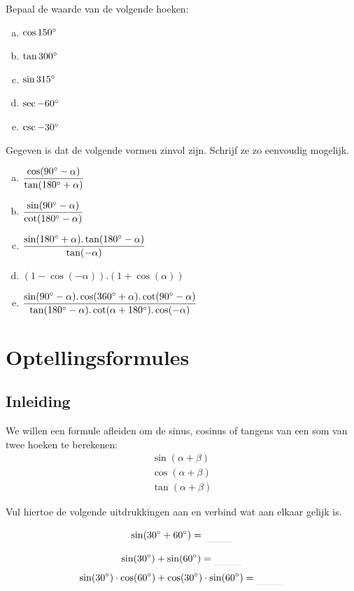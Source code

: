 \documentclass[a4paper,12pt]{article}
\begin{document}
\begin{oefening}
Bepaal de waarde van de volgende hoeken:
\begin{enumerate}[(a)]
  \itemsep.5em
  \item $\cos 150^\circ$
  \item $\tan 300^\circ$
  \item $\sin 315^\circ$
  \item $\sec -60^\circ$
  \item $\csc -30^\circ$
\end{enumerate}
\end{oefening}

\begin{oefening}
Gegeven is dat de volgende vormen zinvol zijn. Schrijf ze zo eenvoudig mogelijk.
\begin{enumerate}[(a)]
  \itemsep1em
  \item $\dfrac{\cos(90^\circ-\alpha)}{\tan(180^\circ+\alpha)}$
  \item $\dfrac{\sin(90^\circ-\alpha)}{\cot(180^\circ-\alpha)}$
  \item $\dfrac{\sin(180^\circ+\alpha).\tan(180^\circ-\alpha)}{\tan(-\alpha)}$
  \item $(1-\cos(-\alpha)).(1+\cos(\alpha))$
  \item $\dfrac{\sin(90^\circ-\alpha).\cos(360^\circ+\alpha).\cot(90^\circ-\alpha)}{\tan(180^\circ-\alpha).\cot(\alpha+180^\circ).\cos(-\alpha)}$
\end{enumerate}
\end{oefening}

\newpage
\section{Optellingsformules}

\subsection{Inleiding}
We willen een formule afleiden om de sinus, cosinus of tangens van een som van twee hoeken te berekenen:
\begin{align*}
  \sin(\alpha + \beta)\\
  \cos(\alpha + \beta)\\
  \tan(\alpha+\beta)
\end{align*}

Vul hiertoe de volgende uitdrukkingen aan en verbind wat aan elkaar gelijk is.

\begin{minipage}{0.4\textwidth}
  $$\sin(30\degree + 60\degree)=\arule{1cm}$$
\end{minipage}
\begin{minipage}{0.5\textwidth}
  $$\sin(30\degree) + \sin(60\degree)=\arule{1cm}$$
  $$\sin(30\degree)\cdot\cos(60\degree)+\cos(30\degree)\cdot\sin(60\degree)=\arule{1cm}$$
\end{minipage}
\end{document}
